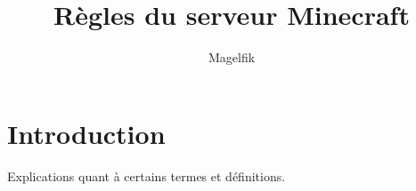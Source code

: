 \documentclass[a4paper,11pt]{article}
\author{Magelfik}
\title{R\`egles du serveur Minecraft}
\begin{document}
\maketitle

\clearpage
\tableofcontents
\clearpage

\section{Introduction}
Explications quant \`a certains termes et d\'efinitions.
\section{}

\clearpage
\end{document}
